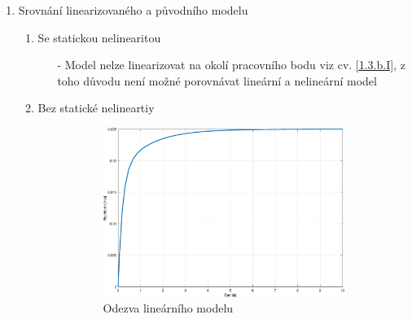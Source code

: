 \documentclass{article}
\begin{document}
\begin{enumerate}
\begin{enumerate}
            \item Srovnání linearizovaného a původního modelu
                \begin{enumerate}
                    \item Se statickou nelinearitou
                        \begin{itemize}
                            \item[-] Model nelze linearizovat na okolí pracovního bodu viz cv. \underline{\ref{1.3.b.I}}, z toho důvodu není možné porovnávat lineární a nelineární model
                        \end{itemize}

                    \newpage
                    
                    \item Bez statické nelineartiy\\
                        \begin{figure}[H]
                    	\centering
                    	\begin{subfigure}[b]{0.45\textwidth}
                    		\includegraphics[width=\textwidth]{Figures/Odezva_1_3_linearni.eps}
                    		\caption{Odezva lineárního modelu}
                    		\label{fig:LinearFig_13cII}
                    	\end{subfigure}
                    	~
                    	\begin{subfigure}[b]{0.45\textwidth}

\end{subfigure}
\end{figure}
\end{enumerate}
\end{enumerate}
\end{enumerate}
\end{document}
